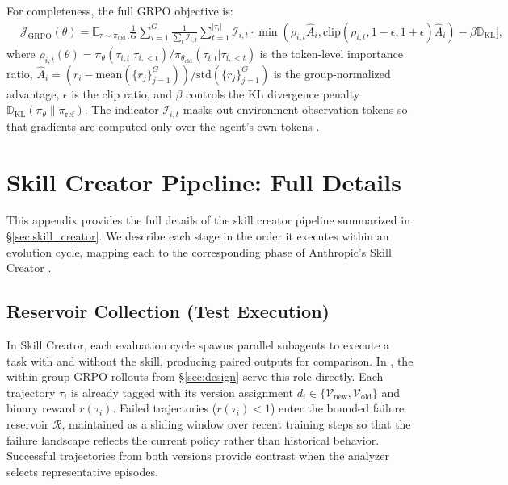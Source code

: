 \documentclass{article}
\theoremstyle{plain}
\theoremstyle{definition}
\theoremstyle{remark}
\begin{document}
For completeness, the full GRPO objective \citep{shao2024deepseekmath} is:
\begin{equation}
\begin{aligned}
&\mathcal{J}_{\text{GRPO}}(\theta) = \mathbb{E}_{\tau \sim \pi_{\text{old}}} \Bigg[ \frac{1}{G} \sum_{i=1}^G \frac{1}{\sum_t \mathcal{I}_{i,t}} \sum_{t=1}^{|\tau_i|}\mathcal{I}_{i,t} \cdot \min \left( \rho_{i,t}\hat{A}_{i}, \text{clip}(\rho_{i,t}, 1{-}\epsilon, 1{+}\epsilon) \hat{A}_{i} \right)  - \beta \mathbb{D}_{\text{KL}} \Bigg],
\end{aligned}
\label{eq:grpo}
\end{equation}
where $\rho_{i,t}(\theta) = {\pi_\theta(\tau_{i,t}|\tau_{i,<t})}/{\pi_{\theta_{\text{old}}}(\tau_{i,t}|\tau_{i,<t})}$ is the token-level importance ratio, $\hat{A}_i = ({r_i - \text{mean}(\{r_j\}_{j=1}^{G})})/{\text{std}(\{r_j\}_{j=1}^{G})}$ is the group-normalized advantage, $\epsilon$ is the clip ratio, and $\beta$ controls the KL divergence penalty $\mathbb{D}_{\text{KL}}(\pi_\theta \| \pi_{\text{ref}})$. The indicator $\mathcal{I}_{i,t}$ masks out environment observation tokens so that gradients are computed only over the agent's own tokens \citep{jin2025search, xue2025simpletir}.

\section{Skill Creator Pipeline: Full Details}
\label{app:skill_pipeline}

This appendix provides the full details of the skill creator pipeline summarized in \S\ref{sec:skill_creator}. We describe each stage in the order it executes within an evolution cycle, mapping each to the corresponding phase of Anthropic's Skill Creator \citep{anthropic2025skillcreator}.

\subsection{Reservoir Collection (Test Execution)}

In Skill Creator, each evaluation cycle spawns parallel subagents to execute a task with and without the skill, producing paired outputs for comparison. In \ours, the within-group GRPO rollouts from \S\ref{sec:design} serve this role directly. Each trajectory $\tau_i$ is already tagged with its version assignment $d_i \in \{\mathcal{V}_{\text{new}}, \mathcal{V}_{\text{old}}\}$ and binary reward $r(\tau_i)$. Failed trajectories ($r(\tau_i) < 1$) enter the bounded failure reservoir $\mathcal{R}$, maintained as a sliding window over recent training steps so that the failure landscape reflects the current policy rather than historical behavior. Successful trajectories from both versions provide contrast when the analyzer selects representative episodes.
\end{document}
